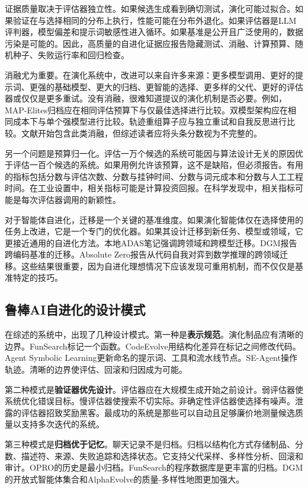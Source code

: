 证据质量取决于评估器独立性。如果候选生成看到确切测试，演化可能过拟合。如果验证在与选择相同的分布上执行，性能可能在分布外退化。如果评估器是LLM评判器，模型偏差和提示词敏感性进入循环。如果基准是公开且广泛使用的，数据污染是可能的。因此，高质量的自进化证据应报告隐藏测试、消融、计算预算、随机种子、失败运行率和回归检查。

消融尤为重要。在演化系统中，改进可以来自许多来源：更多模型调用、更好的提示词、更强的基础模型、更大的归档、更智能的选择、更多样的父代、更好的评估器或仅仅是更多重试。没有消融，很难知道提议的演化机制是否必要。例如，MAP-Elites归档应在相同评估预算下与仅最佳选择进行比较。双模型架构应在相同成本下与单个强模型进行比较。轨迹重组算子应与独立重试和自我反思进行比较。文献开始包含此类消融，但综述读者应将头条分数视为不完整的。

另一个问题是预算归一化。评估一万个候选的系统可能因与算法设计无关的原因优于评估一百个候选的系统。如果用例允许该预算，这不是缺陷，但必须报告。有用的指标包括分数与评估次数、分数与挂钟时间、分数与词元成本和分数与人工工程时间。在工业设置中，相关指标可能是计算投资回报。在科学发现中，相关指标可能是每次评估器调用的新颖性。

对于智能体自进化，迁移是一个关键的基准维度。如果演化智能体仅在选择使用的任务上改进，它是一个专门的优化器。如果其设计迁移到新任务、模型或领域，它更接近通用的自进化方法。本地ADAS笔记强调跨领域和跨模型迁移。DGM报告跨编码基准的迁移。Absolute Zero报告从代码自我对弈到数学推理的跨领域迁移。这些结果很重要，因为自进化理想情况下应该发现可重用机制，而不仅仅是基准特定的技巧。

\subsection{鲁棒AI自进化的设计模式}
\label{subsec:evolution-design-patterns}

在综述的系统中，出现了几种设计模式。第一种是\textbf{表示规范}。演化制品应有清晰的边界。FunSearch标记一个函数。CodeEvolve用结构化差异在标记之间修改代码。Agent Symbolic Learning更新命名的提示词、工具和流水线节点。SE-Agent操作轨迹。清晰的边界使评估、回滚和归因成为可能。

第二种模式是\textbf{验证器优先设计}。评估器应在大规模生成开始之前设计。弱评估器使系统优化错误目标。慢评估器使搜索不切实际。非确定性评估器使选择有噪声。泄露的评估器招致奖励黑客。最成功的系统是那些可以自动且足够廉价地测量候选质量以支持多次迭代的系统。

第三种模式是\textbf{归档优于记忆}。聊天记录不是归档。归档以结构化方式存储制品、分数、描述符、来源、失败追踪和选择状态。它支持父代采样、多样性分析、回滚和审计。OPRO的历史是最小归档。FunSearch的程序数据库是更丰富的归档。DGM的开放式智能体集合和AlphaEvolve的质量-多样性地图更加强大。

